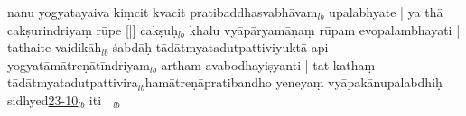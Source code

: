 \documentclass[article,12pt,a4paper]{memoir}%
\newcounter{parCount}
\begin{document}
	  
	  \pstart \leavevmode%
	nanu yogyatayaiva kiṃcit kvacit pratibaddhasvabhāvam{\tiny $_{lb}$} upalabhyate | ya \leavevmode{}thā cakṣurindriyaṃ rūpe [|] cakṣuḥ{\tiny $_{lb}$} khalu vyāpāryamāṇaṃ rūpam evopalambhayati | tathaite vaidikāḥ{\tiny $_{lb}$} śabdāḥ tādātmyatadutpattiviyuktā api yogyatāmātreṇātīndriyam{\tiny $_{lb}$} artham avabodhayiṣyanti | tat kathaṃ tādātmyatadutpattivira{\tiny $_{lb}$}hamātreṇāpratibandho yeneyaṃ vyāpakānupalabdhiḥ sidhyed\url{23-10}{\tiny $_{lb}$} iti |
	{}
	\pend%
      {\tiny $_{lb}$}
\end{document}
